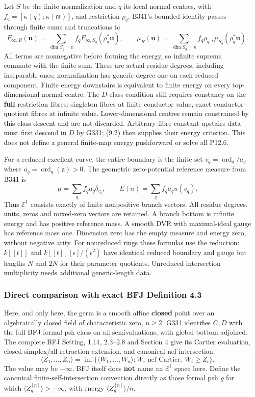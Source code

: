 \documentclass[
]{article}
\begin{document}
Let \(S\) be the finite normalization and \(q\) its local normal
centres, with \(f_q=[\kappa(q):\kappa(\mathfrak m)]\), and restriction
\(\rho_q\). B341's bounded identity passes through finite sums and
truncations to
\[F_{\infty,R}(\boldsymbol u)=\sum_{\dim S_q=n}f_q F_{\infty,S_q}(\rho_q^*\boldsymbol u),\qquad
\mu_R(\boldsymbol u)=\sum_{\dim S_q=n}f_q\rho_{q,*}\mu_{S_q}(\rho_q^*\boldsymbol u).\tag{9.2}\]
All terms are nonnegative before forming the energy, so infinite suprema
commute with the finite sum. These are actual residue degrees, including
inseparable ones; normalization has generic degree one on each reduced
component. Finite energy downstairs is equivalent to finite energy on
every top-dimensional normal centre. The \(D\)-class condition still
requires constancy on the \textbf{full} restriction fibres: singleton
fibres at finite conductor value, exact conductor-quotient fibres at
infinite value. Lower-dimensional centres remain constrained by this
class descent and are not discarded. Arbitrary fibre-constant upstairs
data must first descend in \(D\) by G331; (9.2) then supplies their
energy criterion. This does not define a general finite-map energy
pushforward or solve all P12.6.

For a reduced excellent curve, the entire boundary is the finite set
\(v_q=\operatorname{ord}_q/a_q\) where
\(a_q=\operatorname{ord}_q(\mathfrak a)>0\). The geometric
zero-potential reference measure from B341 is
\[\mu=\sum_q f_q a_q\delta_{v_q},\qquad E(u)=\sum_qf_qa_qu(v_q).\] Thus
\(\mathcal E^1\) consists exactly of finite nonpositive branch vectors.
All residue degrees, units, zeros and mixed-zero vectors are retained. A
branch bottom is infinite energy and has positive reference mass. A
smooth DVR with maximal-ideal gauge has reference mass one. Dimension
zero has the empty measure and energy zero, without negative arity. For
nonreduced rings these formulas use the reduction: \(k[[t]]\) and
\(k[[t]][\epsilon]/(\epsilon^2)\) have identical reduced boundary and
gauge but lengths \(N\) and \(2N\) for their parameter quotients.
Unreduced intersection multiplicity needs additional generic-length
data.

\subsubsection{Direct comparison with exact BFJ Definition
4.3}\label{direct-comparison-with-exact-bfj-definition-4.3}

Here, and only here, the germ is a smooth affine \textbf{closed} point
over an algebraically closed field of characteristic zero, \(n\ge2\).
G331 identifies \(C,D\) with the full BFJ formal psh class on all
semivaluations, with global bottom adjoined. The complete BFJ Setting,
1.14, 2.3--2.8 and Section 4 give its Cartier evaluation,
closed-simplex/all-retraction extension, and canonical nef intersection
\[\langle Z_1,\ldots,Z_n\rangle=\inf\{\langle W_1,\ldots,W_n\rangle:W_i\text{ nef Cartier},\ W_i\ge Z_i\}.\tag{BFJ4.3}\]
The value may be \(-\infty\). BFJ itself does \textbf{not} name an
\(\mathcal E^1\) space here. Define the canonical
finite-self-intersection convention directly as those formal psh \(g\)
for which \(\langle Z_g^{[n]}\rangle> -\infty\), with energy
\(\langle Z_g^{[n]}\rangle/n\).
\end{document}
